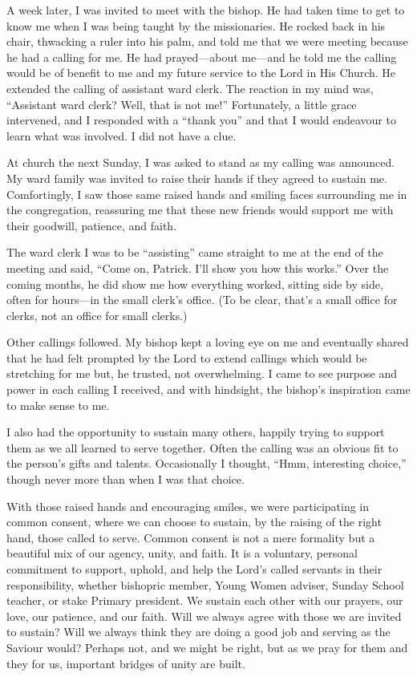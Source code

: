 \documentclass[letterpaper, 11pt]{report}
\newcommand{\intalkheader}[1]{
    \vspace{0.75em}
    \noindent{\normalsize\bfseries #1}
    \par\nopagebreak %
    \vspace{0.25em}
    \nopagebreak     %
}
\begin{document}
A week later, I was invited to meet with the bishop. He had taken time to get to know me when I was being taught by the missionaries. He rocked back in his chair, thwacking a ruler into his palm, and told me that we were meeting because he had a calling for me. He had prayed—about me—and he told me the calling would be of benefit to me and my future service to the Lord in His Church. He extended the calling of assistant ward clerk. The reaction in my mind was, “Assistant ward clerk? Well, that is not me!” Fortunately, a little grace intervened, and I responded with a “thank you” and that I would endeavour to learn what was involved. I did not have a clue.

At church the next Sunday, I was asked to stand as my calling was announced. My ward family was invited to raise their hands if they agreed to sustain me. Comfortingly, I saw those same raised hands and smiling faces surrounding me in the congregation, reassuring me that these new friends would support me with their goodwill, patience, and faith.

The ward clerk I was to be “assisting” came straight to me at the end of the meeting and said, “Come on, Patrick. I’ll show you how this works.” Over the coming months, he did show me how everything worked, sitting side by side, often for hours—in the small clerk’s office. (To be clear, that’s a small office for clerks, not an office for small clerks.)

Other callings followed. My bishop kept a loving eye on me and eventually shared that he had felt prompted by the Lord to extend callings which would be stretching for me but, he trusted, not overwhelming. I came to see purpose and power in each calling I received, and with hindsight, the bishop’s inspiration came to make sense to me.

I also had the opportunity to sustain many others, happily trying to support them as we all learned to serve together. Often the calling was an obvious fit to the person’s gifts and talents. Occasionally I thought, “Hmm, interesting choice,” though never more than when I was that choice.

\intalkheader{Common Consent}

With those raised hands and encouraging smiles, we were participating in common consent, where we can choose to sustain, by the raising of the right hand, those called to serve. Common consent is not a mere formality but a beautiful mix of our agency, unity, and faith. It is a voluntary, personal commitment to support, uphold, and help the Lord’s called servants in their responsibility, whether bishopric member, Young Women adviser, Sunday School teacher, or stake Primary president. We sustain each other with our prayers, our love, our patience, and our faith. Will we always agree with those we are invited to sustain? Will we always think they are doing a good job and serving as the Saviour would? Perhaps not, and we might be right, but as we pray for them and they for us, important bridges of unity are built.
\end{document}
